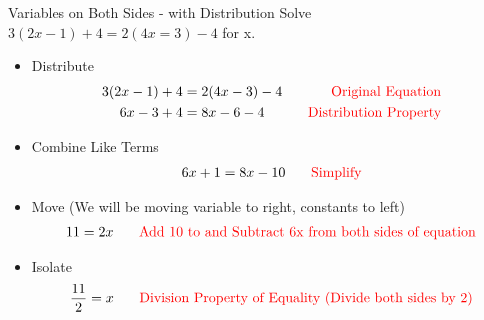 \begin{example}{Variables on Both Sides - with Distribution}{}
    Solve $3(2x-1)+4=2(4x=3)-4$ for x.
    \begin{itemize}
        \item Distribute
        \begin{align*}
            3(2x-1)+4&=2(4x-3)-4&\;\;\;\textcolor{red}{\textrm{Original Equation}}\\
            6x-3+4&=8x-6-4&\;\;\;\textcolor{red}{\textrm{Distribution Property}}\\
        \end{align*}
        \item[] Combine Like Terms
        \begin{align*}    
            6x+1&=8x-10&\;\;\;\textcolor{red}{\textrm{Simplify}}\\
        \end{align*}
        \item[] Move (We will be moving variable to right, constants to left)
        \begin{align*}    
            11&=2x&\;\;\;\textcolor{red}{\textrm{Add 10 to and Subtract 6x from both sides of equation}}\\
        \end{align*}
        \item[] Isolate
        \begin{align*}    
            \dfrac{11}{2}&=x&\;\;\;\textcolor{red}{\textrm{Division Property of Equality (Divide both sides by 2)}}\\
        \end{align*}        
    \end{itemize}
\end{example}